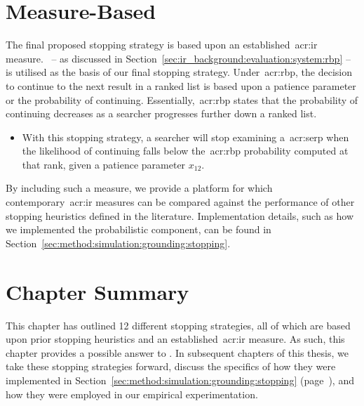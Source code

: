 \section{Measure-Based}
The final proposed stopping strategy is based upon an established~\gls{acr:ir} measure.~ -- as discussed in Section~\ref{sec:ir_background:evaluation:system:rbp} -- is utilised as the basis of our final stopping strategy. Under~\gls{acr:rbp}, the decision to continue to the next result in a ranked list is based upon a patience parameter or the probability of continuing. Essentially,~\gls{acr:rbp} states that the probability of continuing decreases as a searcher progresses further down a ranked list.

\begin{itemize}
    \item{ With this stopping strategy, a searcher will stop examining a~\gls{acr:serp} when the likelihood of continuing falls below the~\gls{acr:rbp} probability computed at that rank, given a patience parameter $x_{12}$.}
\end{itemize}

By including such a measure, we provide a platform for which contemporary~\gls{acr:ir} measures can be compared against the performance of other stopping heuristics defined in the literature. Implementation details, such as how we implemented the probabilistic component, can be found in Section~\ref{sec:method:simulation:grounding:stopping}.

\section{Chapter Summary}
This chapter has outlined 12 different stopping strategies, all of which are based upon prior stopping heuristics and an established~\gls{acr:ir} measure. As such, this chapter provides a possible answer to . In subsequent chapters of this thesis, we take these stopping strategies forward, discuss the specifics of how they were implemented in Section~\ref{sec:method:simulation:grounding:stopping} (page~\pageref{sec:method:simulation:grounding:stopping}), and how they were employed in our empirical experimentation.